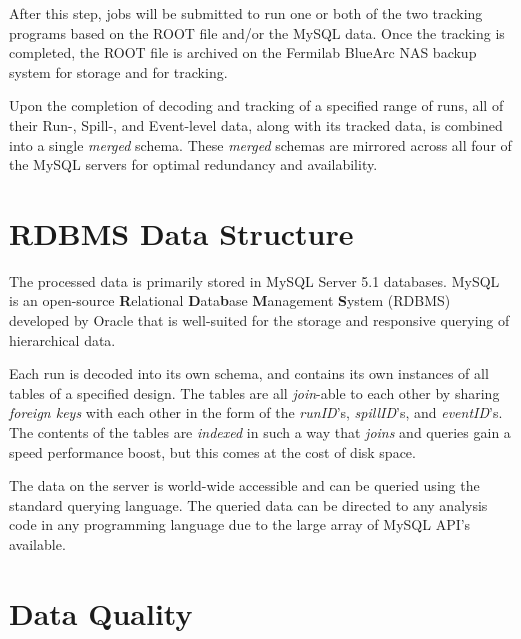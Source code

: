 After this step, jobs will be submitted to run one or both of the two tracking programs based on the ROOT file and/or the MySQL data. Once the tracking is completed, the ROOT file is archived on the Fermilab BlueArc NAS backup system for storage and for tracking.

Upon the completion of decoding and tracking of a specified range of runs, all of their Run-, Spill-, and Event-level data, along with its tracked data, is combined into a single \emph{merged} schema. These \emph{merged} schemas are mirrored across all four of the MySQL servers for optimal redundancy and availability.

\section{RDBMS Data Structure}

The processed data is primarily stored in MySQL Server 5.1 databases. MySQL is an open-source \textbf{R}elational \textbf{D}ata\textbf{b}ase \textbf{M}anagement \textbf{S}ystem (RDBMS) developed by Oracle that is well-suited for the storage and responsive querying of hierarchical data.

Each run is decoded into its own schema, and contains its own instances of all tables of a specified design. The tables are all \emph{join}-able to each other by sharing \emph{foreign keys} with each other in the form of the \emph{runID}'s, \emph{spillID}'s, and \emph{eventID}'s. The contents of the tables are \emph{indexed} in such a way that \emph{joins} and queries gain a speed performance boost, but this comes at the cost of disk space.

The data on the server is world-wide accessible and can be queried using the standard querying language. The queried data can be directed to any analysis code in any programming language due to the large array of MySQL API's available.

\section{Data Quality}


